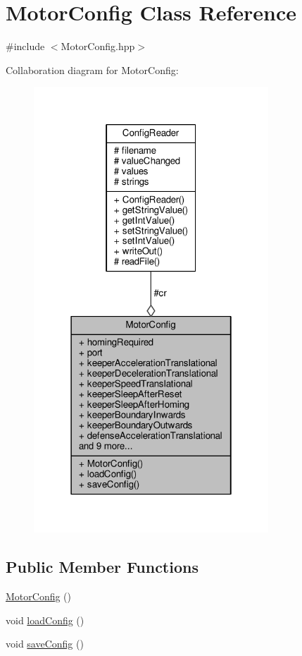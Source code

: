 \hypertarget{class_motor_config}{}\section{Motor\+Config Class Reference}
\label{class_motor_config}


{\ttfamily \#include $<$Motor\+Config.\+hpp$>$}



Collaboration diagram for Motor\+Config\+:\nopagebreak
\begin{figure}[H]
\begin{center}
\leavevmode
\includegraphics[width=250pt]{class_motor_config__coll__graph}
\end{center}
\end{figure}
\subsection*{Public Member Functions}
\begin{DoxyCompactItemize}
\item 
\hyperlink{class_motor_config_a466fa31fbd6ce247caa36d1ea94a5a66}{Motor\+Config} ()
\item 
void \hyperlink{class_motor_config_af31d365ad1485d9d06180d4e264d1fa8}{load\+Config} ()
\item 
void \hyperlink{class_motor_config_aa9d5ac8fd14a9e7ed1c4c73e0030b161}{save\+Config} ()
\end{DoxyCompactItemize}
